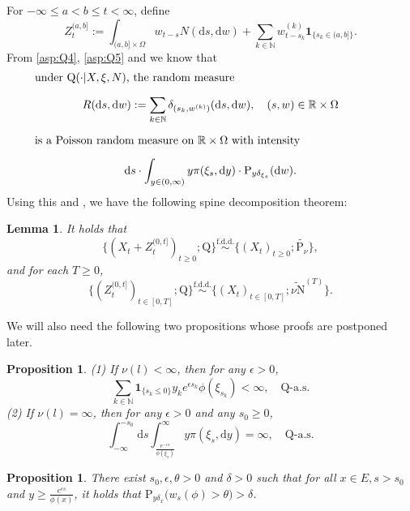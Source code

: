 \documentclass[12pt,a4paper]{amsart}
\numberwithin{equation}{section}
\theoremstyle{plain}
\newtheorem{lem}[thm]{Lemma}
\newtheorem{prop}[thm]{Proposition}
\theoremstyle{definition}
\theoremstyle{remark}
\begin{document}
	For $-\infty \leq a < b \leq t<\infty$, define
\begin{equation} \label{eq:E.4}
	Z_t^{(a,b]}
	:= \int_{(a,b]\times \Omega} w_{t-s} N(\mathrm ds,\mathrm dw) + \sum_{k\in \mathbb N} w^{(k)}_{t-s_k} \mathbf 1_{\{s_k \in (a,b]\}}.
\end{equation}
	From \eqref{asp:Q4}, \eqref{asp:Q5} and \cite[Theorem 3.2(i)]{Kallenberg2017Random} we know that
\begin{equation}\label{eq:E.45}
\begin{minipage}{0.9\textwidth}
	under $\mathrm Q(\cdot | X, \xi, N)$, the random measure
\[
	R(\mathrm ds,\mathrm dw)
	:=\sum_{k\in \mathbb N} \delta_{(s_k, w^{(k)})}(\mathrm ds,\mathrm dw),
	\quad (s,w)\in \mathbb R\times \Omega
\]
	is a Poisson random measure on $\mathbb R \times \Omega$ with intensity
	\[
	\mathrm ds \cdot \int_{y\in (0,\infty)} y \pi(\xi_s, \mathrm dy)\cdot \mathrm P_{y\delta_{\xi_s}}(\mathrm dw).
	\]
\end{minipage}
\end{equation}
	Using this and \cite[Theorem 1.5 \& Corollary 1.6]{RenSongSun2020Spine}, we have the following spine decomposition theorem:
\begin{lem} \label{thm:E.2}
	It holds that
	\[
	\{(X_t + Z_t^{(0,t]})_{t\geq 0}; \mathrm Q\} \overset{\text{f.d.d.}}\sim \{(X_t)_{t\geq 0}; \widetilde{\mathrm P_\nu}\},
	\]
	and for each $T\geq 0$,
\[
	\{(Z_t^{(0,t]})_{t\in [0,T]}; \mathrm Q\} \overset{\text{f.d.d.}} \sim \{ (X_t)_{t\in [0,T]}; \widetilde{\nu \mathrm N}^{(T)}\}.
\]
\end{lem}
	We will also need the following two propositions whose proofs are postponed later.
\begin{prop}\label{thm:E.4}	
	(1) If $\nu(l)<\infty$,
	then for any $\epsilon>0$,
\[
	\sum_{k\in \mathbb N} \mathbf 1_{\{s_k \leq 0\}} y_k e^{\epsilon s_k} \phi(\xi_{s_k})
	< \infty,
	\quad \mathrm Q\text{-a.s.}
\]
	(2) If  $ \nu(l)=\infty$,
	then for any $\epsilon>0$ and any $s_0\geq 0$,
   	\begin{equation}
	\int^{-s_0}_{-\infty} {\mathrm d}s
	\int_{\frac{e^{-\epsilon s}}{\phi(\xi_s)}}^\infty y\pi(\xi_s,{\mathrm d}y)
     	=\infty,
	\quad {\mathrm Q}\text{-a.s.}
	\end{equation}
\end{prop}
\begin{prop} \label{thm:E.5}
 	There exist $s_0, \epsilon, \theta>0$ and $\delta > 0$  such that for all $x\in E, s>s_0$ and $y\geq \frac{e^{\epsilon s}}{ \phi(x)}$, it holds that $\mathrm P_{y \delta_{x}}\big(w_{s}(\phi)>\theta\big) > \delta$.
\end{prop}
\end{document}
